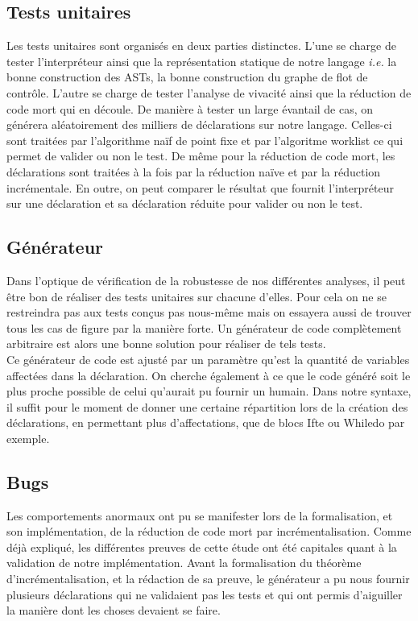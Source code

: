 \documentclass[a4paper, 10pt]{article}
\begin{document}
\subsection{Tests unitaires}
Les tests unitaires sont organisés en deux parties distinctes. L'une se charge de tester l'interpréteur ainsi que la représentation
statique de notre langage \textit{i.e.} la bonne construction des ASTs, la bonne construction du graphe de flot de
contrôle. L'autre se charge de tester l'analyse de vivacité ainsi que la réduction de code mort qui en découle. De
manière à tester un large évantail de cas, on générera aléatoirement des milliers de déclarations sur notre langage.
Celles-ci sont traitées par l'algorithme naïf de point fixe et par l'algoritme worklist ce qui permet de valider ou non le test.
De même pour la réduction de code mort, les déclarations sont traitées à la fois par la réduction naïve et par la réduction
incrémentale. En outre, on peut comparer le résultat que fournit l'interpréteur sur une déclaration et sa déclaration réduite
pour valider ou non le test.
\subsection{Générateur}
Dans l'optique de vérification de la robustesse de nos différentes analyses, il peut être bon de réaliser
des tests unitaires sur chacune d'elles. Pour cela on ne se restreindra pas aux tests conçus pas nous-même
mais on essayera aussi de trouver tous les cas de figure par la manière forte. Un générateur de code complètement
arbitraire est alors une bonne solution pour réaliser de tels tests.
\\
Ce générateur de code est ajusté par un paramètre qu'est la quantité de variables affectées dans la déclaration. On
cherche également à ce que le code généré soit le plus proche possible de celui qu'aurait pu fournir un humain.
Dans notre syntaxe, il suffit pour le moment de donner une certaine répartition lors de la création des déclarations,
en permettant plus d'affectations, que de blocs Ifte ou Whiledo par exemple.
\subsection{Bugs}
Les comportements anormaux ont pu se manifester lors de la formalisation, et son implémentation, de la réduction de code
mort par incrémentalisation. Comme déjà expliqué, les différentes preuves de cette étude ont été capitales quant à la validation
de notre implémentation. Avant la formalisation du théorème d'incrémentalisation, et la rédaction de sa preuve, le générateur
a pu nous fournir plusieurs déclarations qui ne validaient pas les tests et qui ont permis d'aiguiller la manière dont les choses
devaient se faire.
\end{document}
